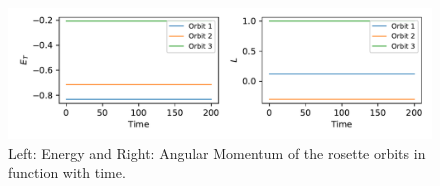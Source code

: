 \subsection{}



\begin{figure}
    \centering
    \includegraphics{CodeAndFigures/EnergyMomentumPlot.pdf}
    \caption{Left: Energy and Right: Angular Momentum of the rosette orbits in function with time.}
    \label{fig:conservedQuants}
\end{figure}
